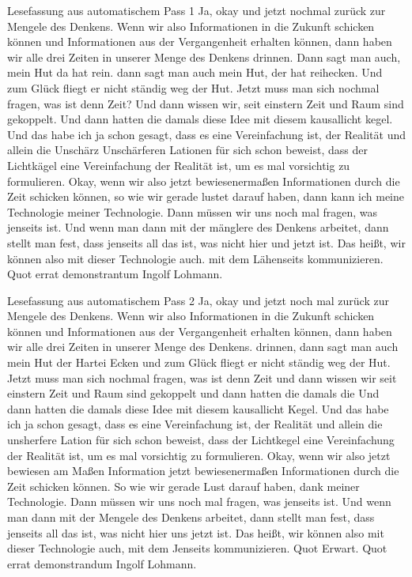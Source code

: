 \documentclass[11pt,a4paper]{article}
\begin{document}
\begin{asrbox}{Lesefassung aus automatischem Pass 1}
Ja, okay und jetzt nochmal zurück zur Mengele des Denkens. Wenn wir also Informationen in die Zukunft schicken können und Informationen aus der Vergangenheit erhalten können, dann haben wir alle drei Zeiten in unserer Menge des Denkens drinnen. Dann sagt man auch, mein Hut da hat rein. dann sagt man auch mein Hut, der hat reihecken. Und zum Glück fliegt er nicht ständig weg der Hut. Jetzt muss man sich nochmal fragen, was ist denn Zeit? Und dann wissen wir, seit einstern Zeit und Raum sind gekoppelt. Und dann hatten die damals diese Idee mit diesem kausallicht kegel. Und das habe ich ja schon gesagt, dass es eine Vereinfachung ist, der Realität und allein die Unschärz Unschärferen Lationen für sich schon beweist, dass der Lichtkägel eine Vereinfachung der Realität ist, um es mal vorsichtig zu formulieren. Okay, wenn wir also jetzt bewiesenermaßen Informationen durch die Zeit schicken können, so wie wir gerade lustet darauf haben, dann kann ich meine Technologie meiner Technologie. Dann müssen wir uns noch mal fragen, was jenseits ist. Und wenn man dann mit der mänglere des Denkens arbeitet, dann stellt man fest, dass jenseits all das ist, was nicht hier und jetzt ist. Das heißt, wir können also mit dieser Technologie auch. mit dem Lähenseits kommunizieren. Quot errat demonstrantum Ingolf Lohmann.
\end{asrbox}

\begin{asrbox}{Lesefassung aus automatischem Pass 2}
Ja, okay und jetzt noch mal zurück zur Mengele des Denkens. Wenn wir also Informationen in die Zukunft schicken können und Informationen aus der Vergangenheit erhalten können, dann haben wir alle drei Zeiten in unserer Menge des Denkens. drinnen, dann sagt man auch mein Hut der Hartei Ecken und zum Glück fliegt er nicht ständig weg der Hut. Jetzt muss man sich nochmal fragen, was ist denn Zeit und dann wissen wir seit einstern Zeit und Raum sind gekoppelt und dann hatten die damals die Und dann hatten die damals diese Idee mit diesem kausallicht Kegel. Und das habe ich ja schon gesagt, dass es eine Vereinfachung ist, der Realität und allein die unsherfere Lation für sich schon beweist, dass der Lichtkegel eine Vereinfachung der Realität ist, um es mal vorsichtig zu formulieren. Okay, wenn wir also jetzt bewiesen am Maßen Information jetzt bewiesenermaßen Informationen durch die Zeit schicken können. So wie wir gerade Lust darauf haben, dank meiner Technologie. Dann müssen wir uns noch mal fragen, was jenseits ist. Und wenn man dann mit der Mengele des Denkens arbeitet, dann stellt man fest, dass jenseits all das ist, was nicht hier uns jetzt ist. Das heißt, wir können also mit dieser Technologie auch, mit dem Jenseits kommunizieren. Quot Erwart. Quot errat demonstrandum Ingolf Lohmann.
\end{asrbox}
\end{document}
